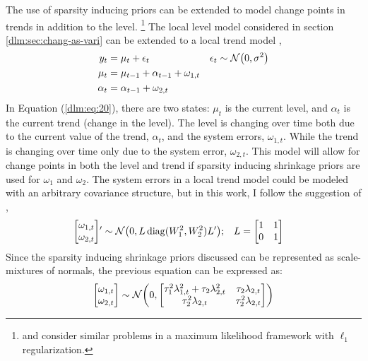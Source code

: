 The use of sparsity inducing priors can be extended to model change points in trends in addition to the level.%
\footnote{\textcite{KimKohBoydEtAl2009} and \textcite{Tibshirani2014} consider similar problems in a maximum likelihood framework with $\ell_{1}$ regularization.}
The local level model considered in section \ref{dlm:sec:chang-as-vari} can be extended to a local trend model \parencites[Ch 3.2]{DurbinKoopman2012}[Ch 7]{WestHarrison1997},
\begin{equation}
  \label{dlm:eq:20}
  \begin{aligned}[t]
    y_{t} &= \mu_{t} + \epsilon_{t} & \epsilon_{t} & \sim \mathcal{N}\mathopen{}\left(0, \sigma^{2}\right)\mathclose{} \\
    \mu_{t} &= \mu_{t - 1} + \alpha_{t - 1} + \omega_{1, t} \\
    \alpha_{t} &= \alpha_{t - 1} + \omega_{2, t} 
  \end{aligned}
\end{equation}
In Equation (\ref{dlm:eq:20}), there are two states: $\mu_{t}$ is the current level, and $\alpha_{t}$ is the current trend (change in the level).
The level is changing over time both due to the current value of the trend, $\alpha_{t}$, and the system errors, $\omega_{1,t}$.
While the trend is changing over time only due to the system error, $\omega_{2,t}$.
This model will allow for change points in both the level and trend if sparsity inducing shrinkage priors are used for $\omega_{1}$ and $\omega_{2}$.
The system errors in a local trend model could be modeled with an arbitrary covariance structure, but in this work, I follow the suggestion of \textcite[Ch 7.]{WestHarrison1997},
\begin{equation}
  \label{dlm:eq:29}
  \begin{aligned}[t]
  \begin{bmatrix}
    \omega_{1, t} \\
    \omega_{2, t}
  \end{bmatrix} 
  & '\sim \mathcal{N}\mathopen{}\left(0,
    L \operatorname{diag}(W_{1}^{2}, W_{2}^{2}) L'
  \right)\mathclose{} ; &
  L &= 
  \begin{bmatrix}
    1 & 1 \\
    0 & 1 
  \end{bmatrix}
  \end{aligned}
\end{equation}
Since the sparsity inducing shrinkage priors discussed can be represented as scale-mixtures of normals, the previous equation can be expressed as:
\begin{equation}
\label{dlm:eq:26}
\begin{bmatrix}
  \omega_{1, t} \\
  \omega_{2, t}
\end{bmatrix}
\sim \mathcal{N}\mathopen{}\left(0,
  \begin{bmatrix}
    \tau_{1}^{2} \lambda_{1, t}^{2} + \tau_{2} \lambda_{2, t}^{2} & \tau_{2} \lambda_{2, t} \\
    \tau_{2}^{2} \lambda_{2, t} & \tau_{2}^{2} \lambda_{2, t}
  \end{bmatrix}
\right)\mathclose{}
\end{equation}
